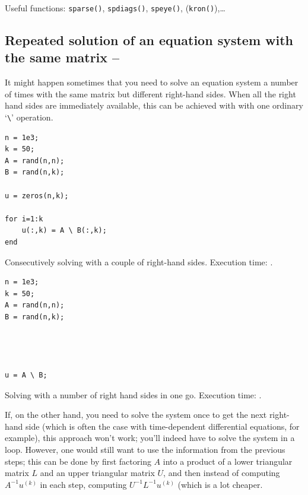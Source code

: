 
\Pointinghand\hspace{1em} Useful functions: \lstinline!sparse()!, \lstinline!spdiags()!, \lstinline!speye()!, (\lstinline!kron()!),\dots



\subsection{Repeated solution of an equation system with the same matrix -- \fastsymbol\fastsymbol\fastsymbol\fastsymbol\fastsymbol}

It might happen sometimes that you need to solve an equation system a number of times with the same matrix but different right-hand sides. When all the right hand sides are immediately available, this can be achieved with with one ordinary `\lstinline!\!' operation.

\hfill
\begin{minipage}[t]{.45\textwidth}
\begin{lstlisting}[framerule=2pt,rulecolor=\color{badred}]
n = 1e3;
k = 50;
A = rand(n,n);
B = rand(n,k);

u = zeros(n,k);

for i=1:k
    u(:,k) = A \ B(:,k);
end
\end{lstlisting}
Consecutively solving with a couple of right-hand sides. Execution time: .
\end{minipage}
\hfill
\begin{minipage}[t]{.45\textwidth}
\begin{lstlisting}[framerule=2pt,rulecolor=\color{goodgreen}]
n = 1e3;
k = 50;
A = rand(n,n);
B = rand(n,k);




u = A \ B;

\end{lstlisting}
Solving with a number of right hand sides in one go. Execution time: .
\end{minipage}
\hfill


If, on the other hand, you need to solve the system once to get the next right-hand side (which is often the case with time-dependent differential equations, for example), this approach won't work; you'll indeed have to solve the system in a loop. However, one would still want to use the information from the previous steps; this can be done by first factoring $A$ into a product of a lower triangular matrix $L$ and an upper triangular matrix $U$, and then instead of computing $A^{-1}u^{(k)}$ in each step, computing $U^{-1}L^{-1}u^{(k)}$ (which is a lot cheaper.

